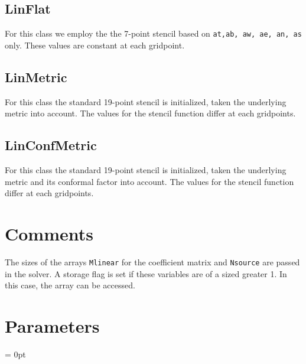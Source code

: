 \documentclass{article}
\newlength{\tableWidth} \newlength{\maxVarWidth} \newlength{\paraWidth} \newlength{\descWidth}
\begin{document}
\subsection{{\bf LinFlat}}
For this class we employ the the 7-point stencil based on {\tt at,ab,
aw, ae, an, as} only. These values are constant at each gridpoint.

\subsection{{\bf LinMetric}}
For this class the standard 19-point stencil is initialized, taken the 
underlying metric into account. The values for the stencil function
differ at each gridpoints.

\subsection{{\bf LinConfMetric}}
For this class the standard 19-point stencil is initialized, taken the 
underlying metric and its conformal factor into account. The values
for the stencil function differ at each gridpoints.

\section{Comments}
The sizes of the arrays {\tt Mlinear} for the coefficient matrix and
{\tt Nsource} are passed in the solver. A storage flag is set if these 
variables are of a sized greater 1. In this case, the array can be
accessed.





\section{Parameters} 


\parskip = 0pt

\setlength{\tableWidth}{160mm}

\setlength{\paraWidth}{\tableWidth}
\setlength{\descWidth}{\tableWidth}
\settowidth{\maxVarWidth}{elliptic\_verbose}

\addtolength{\paraWidth}{-\maxVarWidth}
\addtolength{\paraWidth}{-\columnsep}
\addtolength{\paraWidth}{-\columnsep}
\addtolength{\paraWidth}{-\columnsep}
\end{document}
